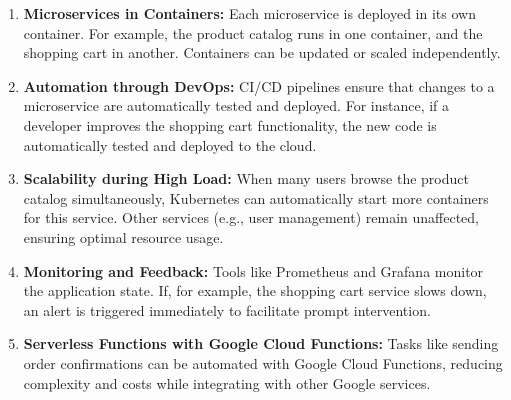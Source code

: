 \begin{enumerate}
    \item \textbf{Microservices in Containers:}
    Each microservice is deployed in its own container. For example, the product catalog runs in one container, and the shopping cart in another. Containers can be updated or scaled independently.
    
    \item \textbf{Automation through DevOps:}
    CI/CD pipelines ensure that changes to a microservice are automatically tested and deployed. For instance, if a developer improves the shopping cart functionality, the new code is automatically tested and deployed to the cloud.
    
    \item \textbf{Scalability during High Load:}
    When many users browse the product catalog simultaneously, Kubernetes can automatically start more containers for this service. Other services (e.g., user management) remain unaffected, ensuring optimal resource usage.
    
    \item \textbf{Monitoring and Feedback:}
    Tools like Prometheus and Grafana monitor the application state. If, for example, the shopping cart service slows down, an alert is triggered immediately to facilitate prompt intervention.
    
\item \textbf{Serverless Functions with Google Cloud Functions:}
Tasks like sending order confirmations can be automated with Google Cloud Functions, reducing complexity and costs while integrating with other Google services.



\end{enumerate}

